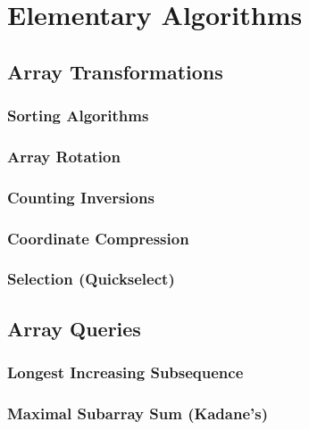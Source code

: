 \chapter{Elementary Algorithms}

\section{Array Transformations}
\setcounter{section}{1}
\setcounter{subsection}{0}
\subsection{Sorting Algorithms}

\subsection{Array Rotation}

\subsection{Counting Inversions}

\subsection{Coordinate Compression}

\subsection{Selection (Quickselect)}


\section{Array Queries}
\setcounter{section}{2}
\setcounter{subsection}{0}
\subsection{Longest Increasing Subsequence}

\subsection{Maximal Subarray Sum (Kadane's)}

